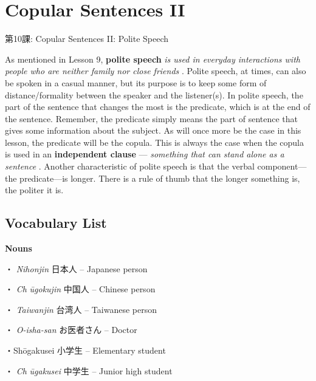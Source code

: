     
\chapter{Copular Sentences II}

\begin{center}
\begin{Large}
第10課: Copular Sentences II: Polite Speech 
\end{Large}
\end{center}
 
\par{ As mentioned in Lesson 9, \textbf{polite speech } \emph{is used in everyday interactions with people who are neither family nor close friends }. Polite speech, at times, can also be spoken in a casual manner, but its purpose is to keep some form of distance\slash formality between the speaker and the listener(s). }
 In polite speech, the part of the sentence that changes the most is the predicate, which is at the end of the sentence. Remember, the predicate simply means the part of sentence that gives some information about the subject. As will once more be the case in this lesson, the predicate will be the copula. This is always the case when the copula is used in an \textbf{independent clause }— \emph{something that can stand alone as a sentence }. Another characteristic of polite speech is that the verbal component—the predicate—is longer. There is a rule of thumb that the longer something is, the politer it is.       
\section{Vocabulary List}
 
\par{\textbf{Nouns }}
 
\par{・ \emph{Nihonjin }日本人 – Japanese person }
 
\par{・ \emph{Ch }\emph{ūgokujin }中国人 – Chinese person }
 
\par{・ \emph{Taiwanjin }台湾人 – Taiwanese person }
 
\par{・ \emph{O-isha-san }お医者さん – Doctor }
 
\par{・Shōgakusei 小学生 – Elementary student }
 
\par{・ \emph{Ch }\emph{ūgakusei }中学生 – Junior high student }
 
